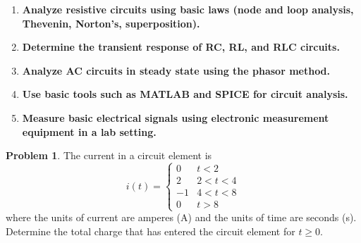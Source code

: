 \documentclass[11pt,letterpaper]{article}
\theoremstyle{definition}
\newtheorem{prob}{\textcolor{problemcolor}{Problem}}  %
\begin{document}
	\noindent\makebox[\linewidth]{\color{rouge_poly}{\rule{\textwidth}{1.5pt}}}
	
\begin{enumerate}
	\item[{\textbf{CLO1:}}] \textbf{Analyze resistive circuits using basic laws (node and loop analysis, Thevenin, Norton's, superposition).}
	\item[{\textbf{CLO2:}}] \textbf{Determine the transient response of RC, RL, and RLC circuits.}
	\item[{\textbf{CLO3:}}] \textbf{Analyze AC circuits in steady state using the phasor method.}
	\item[{\textbf{CLO4:}}] \textbf{Use basic tools such as MATLAB and SPICE for circuit analysis.}
	\item[{\textbf{CLO5:}}] \textbf{Measure basic electrical signals using electronic measurement equipment in a lab setting.}
\end{enumerate}

	\noindent\makebox[\linewidth]{\color{rouge_poly}{\rule{\textwidth}{1.5pt}}}
	\newpage
	

\begin{prob}\label{pb:p1} The current in a circuit element is  
\[
	i(t) =
	\begin{cases}
		0 & t < 2 \\[6pt]
		2 & 2 < t < 4 \\[6pt]
		-1 & 4 < t < 8 \\[6pt]
		0 & t > 8
	\end{cases}
\]
where the units of current are amperes (A) and the units of time are seconds (s).  
	Determine the total charge that has entered the circuit element for $t \geq 0$.
\end{prob}

\noindent\makebox[\linewidth]{\color{rouge_poly}{\rule{\textwidth}{1.3pt}}}
\end{document}

